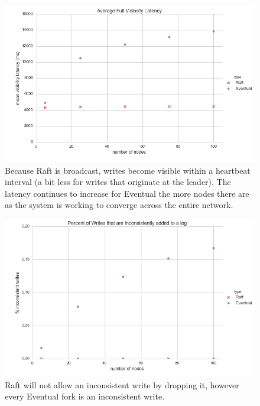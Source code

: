 \documentclass[11pt,letterpaper]{article}
\begin{document}
\begin{figure}[!h]
    \centering
        \includegraphics[width=\textwidth]{figures/visibility_latency.png}
        \caption{\textsf{Because Raft is broadcast, writes become visible within a heartbeat interval (a bit less for writes that originate at the leader). The latency continues to increase for Eventual the more nodes there are as the system is working to converge across the entire network.}}
        \label{fig:visibility_latency}
\end{figure}

\begin{figure}[!h]
    \centering
        \includegraphics[width=\textwidth]{figures/inconsistent_writes.png}
        \caption{\textsf{Raft will not allow an inconsistent write by dropping it, however every Eventual fork is an inconsistent write.}}
        \label{fig:inconsistent_writes}
\end{figure}
\end{document}
